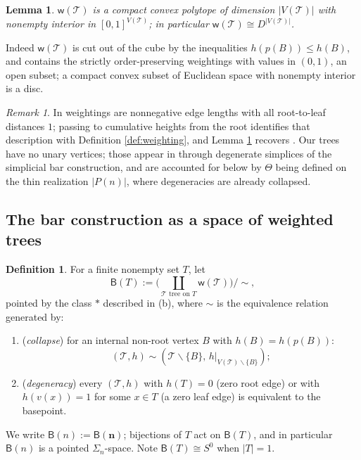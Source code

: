 \documentclass[12pt]{amsart}
\newtheorem{lemma}[subsection]{Lemma}
\theoremstyle{definition}
\newtheorem{definition}[subsection]{Definition}
\theoremstyle{remark}
\newtheorem{remark}[subsection]{Remark}
\newcommand{\BC}{\mathsf{B}}                     %
\newcommand{\TreeF}{\mathcal{T}}                 %
\newcommand{\wt}{\mathsf{w}}                     %
\newcommand{\Thet}{\Theta}                       %
\newcommand{\basept}{\ast}
\begin{document}
\begin{lemma}\label{lem:weightings-disc}
$\wt(\TreeF)$ is a compact convex polytope of dimension $|V(\TreeF)|$ with non\-empty interior in $[0,1]^{V(\TreeF)}$; in particular $\wt(\TreeF)\cong D^{|V(\TreeF)|}$.
\end{lemma}

Indeed $\wt(\TreeF)$ is cut out of the cube by the inequalities $h(p(B))\leq h(B)$, and contains the strictly order-preserving weightings with values in $(0,1)$, an open subset; a compact convex subset of Euclidean space with nonempty interior is a disc.

\begin{remark}\label{rem:ching-weightings}
In \cite[Definitions 3.6--3.10]{Ching-thesis} weightings are nonnegative edge lengths with all root-to-leaf distances $1$; passing to cumulative heights from the root identifies that description with Definition \ref{def:weighting}, and Lemma \ref{lem:weightings-disc} recovers \cite[Lemma 3.9]{Ching-thesis}. Our trees have no unary vertices; those appear in \cite{Ching-thesis} through degenerate simplices of the simplicial bar construction, and are accounted for below by $\Thet$ being defined on the thin realization $|P(n)|$, where degeneracies are already collapsed.
\end{remark}

\subsection{The bar construction as a space of weighted trees}\label{sec:Bdef}

\begin{definition}\label{def:B}
For a finite nonempty set $T$, let
\[ \BC(T) := \Big( \coprod_{\TreeF \text{ tree on } T} \wt(\TreeF) \Big) \Big/ \sim, \]
pointed by the class $\basept$ described in (b), where $\sim$ is the equivalence relation generated by:
\begin{enumerate}[label=(\alph*)]
    \item (\emph{collapse}) for an internal non-root vertex $B$ with $h(B)=h(p(B))$:
    \[(\TreeF, h) \sim (\TreeF\smallsetminus\{B\},\, h|_{V(\TreeF)\smallsetminus\{B\}});\]
    \item (\emph{degeneracy}) every $(\TreeF, h)$ with $h(T)=0$ (zero root edge) or with $h(v(x))=1$ for some $x\in T$ (a zero leaf edge) is equivalent to the basepoint.
\end{enumerate}
We write $\BC(n) := \BC(\mathbf{n})$; bijections of $T$ act on $\BC(T)$, and in particular $\BC(n)$ is a pointed $\Sigma_n$-space. Note $\BC(T)\cong S^0$ when $|T|=1$.
\end{definition}
\end{document}
